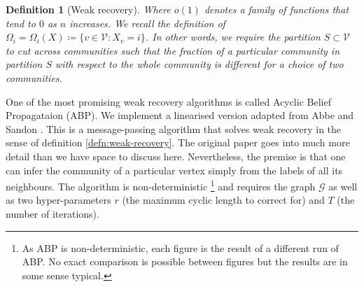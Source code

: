 \documentclass[11pt]{article}
\newcommand{\Gcal}{\mathcal{G}}
\newcommand{\Vcal}{\mathcal{V}}
\newtheorem{definition}{Definition}[section]
\begin{document}
\begin{multicols*}{2}
\begin{definition}[Weak recovery]
	Where $o(1)$ denotes a family of functions that tend to $0$ as $n$ increases. We recall the definition of $\Omega_i = \Omega_i(X) \coloneqq \{v \in \Vcal : X_v = i\}$. In other words, we require the partition $S \subset \Vcal$ to cut across communities such that the fraction of a particular community in partition $S$ with respect to the whole community is different for a choice of two communities.  
\end{definition}

One of the most promising weak recovery algorithms is called Acyclic Belief Propagataion (ABP). We implement a linearised version adapted from Abbe and Sandon \cite{Linear-ABP}. This is a message-passing algorithm that solves weak recovery in the sense of definition \ref{defn:weak-recovery}. The original paper goes into much more detail than we have space to discuss here. Nevertheless, the premise is that one can infer the community of a particular vertex simply from the labels of all its neighbours. The algorithm is non-deterministic
\footnote{As ABP is non-deterministic, each figure is the result of a different run of ABP. No exact comparison is possible between figures but the results are in some sense typical.}
and requires the graph $\Gcal$ as well as two hyper-parameters $r$ (the maximum cyclic length to correct for) and $T$ (the number of iterations).


\end{multicols*}
\end{document}
